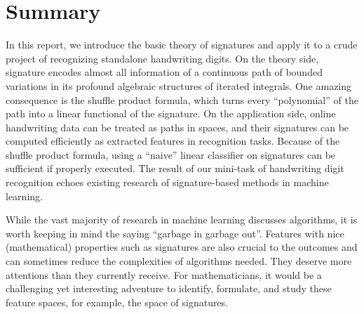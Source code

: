 \documentclass[fleqn]{article}
\theoremstyle{definition}
\theoremstyle{remark}
\begin{document}
\section{Summary}
In this report, we introduce the basic theory of signatures and apply it to a crude project of recognizing standalone handwriting digits. On the theory side, signature encodes almost all information of a continuous path of bounded variations in its profound algebraic structures of iterated integrals. One amazing consequence is the shuffle product formula, which turns every ``polynomial'' of the path into a linear functional of the signature. On the application side, online handwriting data can be treated as paths in spaces, and their signatures can be computed efficiently as extracted features in recognition tasks. Because of the shuffle product formula, using a ``naive'' linear classifier on signatures can be sufficient if properly executed. The result of our mini-task of handwriting digit recognition echoes existing research of signature-based methods in machine learning.
\par
While the vast majority of research in machine learning discusses algorithms, it is worth keeping in mind the saying ``garbage in garbage out''. Features with nice (mathematical) properties such as signatures are also crucial to the outcomes and can sometimes reduce the complexities of algorithms needed. They deserve more attentions than they currently receive. For mathematicians, it would be a challenging yet interesting adventure to identify, formulate, and study these feature spaces, for example, the space of signatures.


\end{document}
